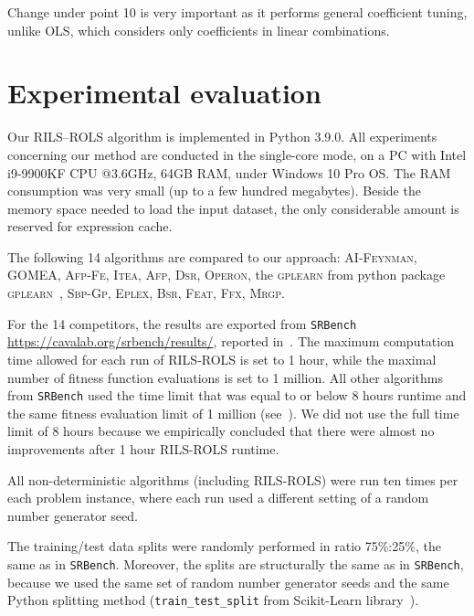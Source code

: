 \documentclass{bmcart}
\begin{document}
Change under point 10 is very important as it performs general coefficient tuning, unlike OLS, which considers only coefficients in linear combinations.  

\section{Experimental evaluation}\label{sec:experiments}

Our \textsc{RILS}--\textsc{ROLS} algorithm is implemented in Python 3.9.0. All experiments concerning our method are conducted in the single-core mode, on a PC with Intel i9-9900KF CPU @3.6GHz, 64GB RAM, under Windows 10 Pro OS. The RAM consumption was very small (up to a few hundred megabytes). Beside the memory space needed to load the input dataset, the only considerable amount is reserved for expression cache. 


The following 14 algorithms are compared to our approach: \textsc{AI-Feynman}, \textsc{GOMEA}, \textsc{Afp-Fe}, \textsc{Itea}, \textsc{Afp}, \textsc{Dsr}, \textsc{Operon}, the \textsc{gplearn} from python package \textsc{gplearn}~\cite{stephens2016genetic}, \textsc{Sbp-Gp}, \textsc{Eplex}, \textsc{Bsr}, \textsc{Feat}, \textsc{Ffx}, \textsc{Mrgp}. 

For the 14 competitors, the results are exported from \texttt{SRBench} \url{https://cavalab.org/srbench/results/}, reported in~\cite{la2021contemporary}. 
The maximum computation time allowed for each run of \textsc{RILS}-\textsc{ROLS} is set to 1 hour, while the maximal number of fitness function evaluations is set to 1 million. All other algorithms from \texttt{SRBench} used the time limit that was equal to or below 8 hours runtime and the same fitness evaluation limit of 1 million (see~\cite{la2021contemporary}). We did not use the full time limit of 8 hours because we empirically concluded that there were almost no improvements after 1 hour \textsc{RILS}-\textsc{ROLS} runtime.

All non-deterministic algorithms (including \textsc{RILS}-\textsc{ROLS}) were run ten times per each problem instance, where each run used a different setting of a random number generator seed. 

The training/test data splits were randomly performed in ratio 75\%:25\%, the same as in \texttt{SRBench}. Moreover, the splits are structurally the same as in \texttt{SRBench}, because we used the same set of random number generator seeds and the same Python splitting method (\texttt{train\_test\_split} from Scikit-Learn library~\cite{scikit-learn}). 
\end{document}
